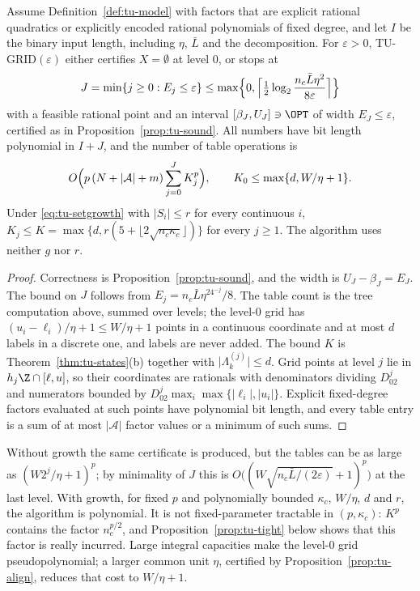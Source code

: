 \begin{theorem}\label{thm:tu-approx}
Assume Definition~\ref{def:tu-model} with factors that are explicit rational
quadratics or explicitly encoded rational polynomials of fixed degree, and
let $I$ be the binary input length, including $\eta$, $\bar L$ and the
decomposition. For $\varepsilon>0$, TU-GRID$(\varepsilon)$ either certifies
$X=\emptyset$ at level $0$, or stops at
\[
J=\min\{j\ge0:E_j\le\varepsilon\}\le
\max\Bigl\{0,\Bigl\lceil\tfrac12\log_2\frac{n_c\bar L\eta^2}{8\varepsilon}\Bigr\rceil\Bigr\}
\]
with a feasible rational point and an interval $[\beta_J,U_J]\ni\OPT$ of width
$E_J\le\varepsilon$, certified as in Proposition~\ref{prop:tu-sound}. All
numbers have bit length polynomial in $I+J$, and the number of table
operations is
\[
O\Bigl(p\,(N+\lvert\mathcal A\rvert+m)\sum_{j=0}^JK_j^p\Bigr),\qquad
K_0\le\max\{d,W/\eta+1\}.
\]
Under \eqref{eq:tu-setgrowth} with $\lvert S_i\rvert\le r$ for every continuous
$i$, $K_j\le K=\max\{d,r(5+\lfloor2\sqrt{n_c\kappa_c}\rfloor)\}$ for every
$j\ge1$. The algorithm uses neither $g$ nor $r$.
\end{theorem}

\begin{proof}
Correctness is Proposition~\ref{prop:tu-sound}, and the width is
$U_J-\beta_J=E_J$. The bound on $J$ follows from $E_j=n_c\bar L\eta^24^{-j}/8$.
The table count is the tree computation above, summed over levels; the
level-$0$ grid has $(u_i-\ell_i)/\eta+1\le W/\eta+1$ points in a continuous
coordinate and at most $d$ labels in a discrete one, and labels are never
added. The bound $K$ is Theorem~\ref{thm:tu-states}(b) together with
$\lvert\Lambda^{(j)}_k\rvert\le d$. Grid points at level $j$ lie in
$h_j\Z\cap[\ell,u]$, so their coordinates are rationals with denominators
dividing $D_02^j$ and numerators bounded by $D_02^j\max_i\max\{\lvert\ell_i\rvert,\lvert u_i\rvert\}$.
Explicit fixed-degree factors evaluated at such points have polynomial bit
length, and every table entry is a sum of at most $\lvert\mathcal A\rvert$ factor
values or a minimum of such sums.
\end{proof}

Without growth the same certificate is produced, but the tables can be as
large as $(W2^j/\eta+1)^p$; by minimality of $J$ this is
$O\bigl((W\sqrt{n_c\bar L/(2\varepsilon)}+1)^p\bigr)$ at the last level. With
growth, for fixed $p$ and polynomially bounded $\kappa_c$, $W/\eta$, $d$ and $r$, the
algorithm is polynomial. It is not fixed-parameter tractable in
$(p,\kappa_c)$: $K^p$ contains the factor $n_c^{p/2}$, and
Proposition~\ref{prop:tu-tight} below shows that this factor is really
incurred. Large integral capacities make the level-$0$ grid
pseudopolynomial; a larger common unit $\eta$, certified by
Proposition~\ref{prop:tu-align}, reduces that cost to $W/\eta+1$.

